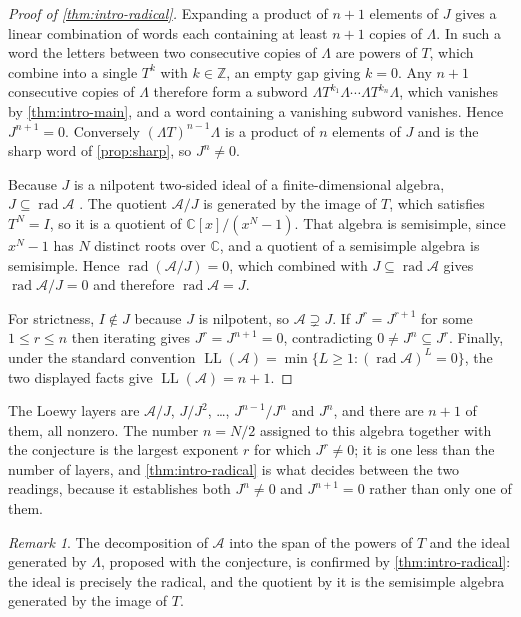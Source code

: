 \documentclass[11pt,reqno]{amsart}
\theoremstyle{plain}
\theoremstyle{definition}
\theoremstyle{remark}
\newtheorem{remark}[theorem]{Remark}
\numberwithin{equation}{section}
\begin{document}
\begin{proof}[Proof of \cref{thm:intro-radical}]
Expanding a product of $n+1$ elements of $J$ gives a linear combination of
words each containing at least $n+1$ copies of $\Lambda$. In such a word the
letters between two consecutive copies of $\Lambda$ are powers of $T$, which
combine into a single $T^{k}$ with $k\in\mathbb{Z}$, an empty gap giving
$k=0$. Any $n+1$ consecutive copies of $\Lambda$ therefore form a subword
$\Lambda T^{k_{1}}\Lambda\cdots\Lambda T^{k_{n}}\Lambda$, which vanishes by
\cref{thm:intro-main}, and a word containing a vanishing subword vanishes.
Hence $J^{n+1}=0$. Conversely $(\Lambda T)^{n-1}\Lambda$ is a product of $n$
elements of $J$ and is the sharp word of \cref{prop:sharp}, so
$J^{n}\ne0$.

Because $J$ is a nilpotent two-sided ideal of a finite-dimensional algebra,
$J\subseteq\operatorname{rad}\mathcal{A}$
\cite{Lam_Book}. The quotient $\mathcal{A}/J$ is generated by the
image of $T$, which satisfies $T^{N}=I$, so it is a quotient of
$\mathbb{C}[x]/(x^{N}-1)$. That algebra is semisimple, since $x^{N}-1$ has $N$
distinct roots over $\mathbb{C}$, and a quotient of a semisimple algebra is
semisimple. Hence $\operatorname{rad}(\mathcal{A}/J)=0$, which combined with
$J\subseteq\operatorname{rad}\mathcal{A}$ gives
$\operatorname{rad}\mathcal{A}/J=0$ and therefore
$\operatorname{rad}\mathcal{A}=J$.

For strictness, $I\notin J$ because $J$ is nilpotent, so
$\mathcal{A}\supsetneq J$. If $J^{r}=J^{r+1}$ for some $1\le r\le n$ then
iterating gives $J^{r}=J^{n+1}=0$, contradicting $0\ne J^{n}\subseteq J^{r}$.
Finally, under the standard convention
$\operatorname{LL}(\mathcal{A})=\min\{L\ge1:(\operatorname{rad}\mathcal{A})^{L}=0\}$,
the two displayed facts give $\operatorname{LL}(\mathcal{A})=n+1$.
\end{proof}

The Loewy layers are $\mathcal{A}/J$, $J/J^{2}$, \dots, $J^{n-1}/J^{n}$ and
$J^{n}$, and there are $n+1$ of them, all nonzero. The number $n=N/2$ assigned
to this algebra together with the conjecture \cite{Qiu_2026ky} is the largest
exponent $r$ for which $J^{r}\ne0$; it is one less than the number of layers,
and \cref{thm:intro-radical} is what decides between the two readings, because
it establishes both $J^{n}\ne0$ and $J^{n+1}=0$ rather than only one of them.

\begin{remark}
The decomposition of $\mathcal{A}$ into the span of the powers of $T$ and the
ideal generated by $\Lambda$, proposed with the conjecture, is confirmed by
\cref{thm:intro-radical}: the ideal is precisely the radical, and the quotient
by it is the semisimple algebra generated by the image of $T$.
\end{remark}
\end{document}

